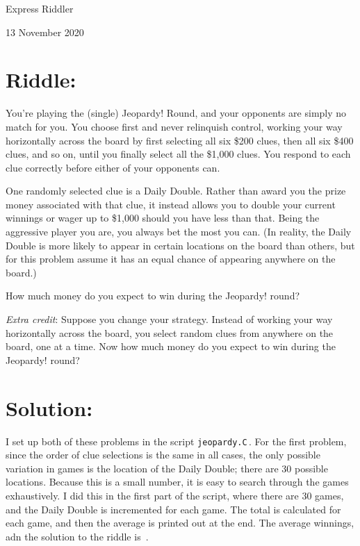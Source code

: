 \documentclass{article}
\begin{document}
\pagestyle{empty} %

\begin{center}
{\LARGE Express Riddler}

\vspace{0.15in}

{\Large 13 November 2020}
\end{center}


\section*{Riddle:}

You're playing the (single) Jeopardy! Round, and your opponents are simply no match for you.
You choose first and never relinquish control, working your way horizontally across the board by first selecting all six \$200 clues, then all six \$400 clues, and so on, until you finally select all the \$1,000 clues.
You respond to each clue correctly before either of your opponents can.

One randomly selected clue is a Daily Double.
Rather than award you the prize money associated with that clue, it instead allows you to double your current winnings or wager up to \$1,000 should you have less than that.
Being the aggressive player you are, you always bet the most you can.
(In reality, the Daily Double is more likely to appear in certain locations on the board than others, but for this problem assume it has an equal chance of appearing anywhere on the board.)

How much money do you expect to win during the Jeopardy! round?

\textit{Extra credit}: Suppose you change your strategy.
Instead of working your way horizontally across the board, you select random clues from anywhere on the board, one at a time.
Now how much money do you expect to win during the Jeopardy! round?


\section*{Solution:}

I set up both of these problems in the script \texttt{jeopardy.C}\,.
For the first problem, since the order of clue selections is the same in all cases, the only possible variation in games is the location of the Daily Double; there are 30 possible locations.
Because this is a small number, it is easy to search through the games exhaustively.
I did this in the first part of the script, where there are 30 games, and the Daily Double is incremented for each game.
The total is calculated for each game, and then the average is printed out at the end.
The average winnings, adn the solution to the riddle is
\,.
\end{document}
